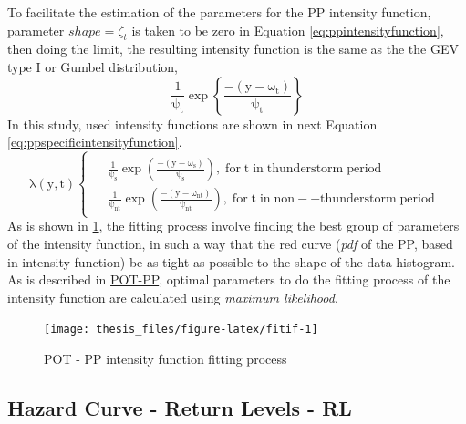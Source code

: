 \documentclass[12pt,oneside]{reedthesis}
\begin{document}
To facilitate the estimation of the parameters for the PP intensity function, parameter \(shape = \zeta_t\) is taken to be zero in Equation \eqref{eq:ppintensityfunction}, then doing the limit, the resulting intensity function is the same as the the GEV type I or Gumbel distribution,
\begin{equation}
  \mathrm{
          \frac{1}{\psi_t}\exp\left\{\frac{-(y-\omega_t)}{\psi_t}\right\}
         }
  \label{eq:ppusedif}
\end{equation}
In this study, used intensity functions are shown in next Equation \eqref{eq:ppspecificintensityfunction}.
\begin{equation}
  \mathrm{
    \lambda\left(y,t\right)
    \begin{cases}
      \begin{split}
            &\frac{1}{\psi_s}\exp\left(\frac{-(y-\omega_s)}{\psi_s}\right),\;for\;t\;in\;thunderstorm\;period
            \\
            &\frac{1}{\psi_{nt}}\exp\left(\frac{-(y-\omega_{nt})}{\psi_{nt}}\right),\;for\;t\;in\;non--thunderstorm\;period      
      \end{split}
    \end{cases}
  }
  \label{eq:ppspecificintensityfunction}
\end{equation}
As is shown in \ref{fig:fitif}, the fitting process involve finding the best group of parameters of the intensity function, in such a way that the red curve (\emph{pdf} of the PP, based in intensity function) be as tight as possible to the shape of the data histogram. As is described in \protect\hyperlink{pot-pp}{POT-PP}, optimal parameters to do the fitting process of the intensity function are calculated using \emph{maximum likelihood}.

\footnotesize
\begin{figure}

{\centering \texttt{[image: thesis\_files/figure-latex/fitif-1]} 

}

\caption{POT - PP intensity function fitting process}\label{fig:fitif}
\end{figure}
\normalsize

\hypertarget{hazard-curve---return-levels---rl}{%
\subsection{Hazard Curve - Return Levels - RL}\label{hazard-curve---return-levels---rl}}
\end{document}
